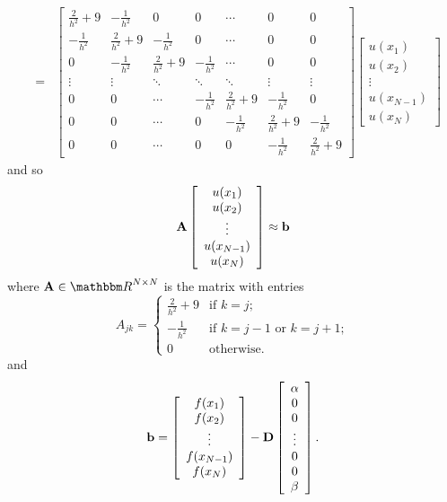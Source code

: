 \begin{solution}
\begin{enumerate}
\begin{eqnarray*}
\\
&=&\left[\begin{array}{ccccccccc} 
\frac{2}{h^2}+9 & -\frac{1}{h^2} & 0 & 0 & \cdots & 0 & 0
\\
-\frac{1}{h^2} & \frac{2}{h^2}+9 & -\frac{1}{h^2} & 0 & \cdots & 0 & 0
\\
 0 & -\frac{1}{h^2} & \frac{2}{h^2}+9 & -\frac{1}{h^2} & \cdots & 0 & 0
\\
\vdots & \vdots & \ddots & \ddots & \ddots & \vdots & \vdots
\\
0 & 0 & \cdots & -\frac{1}{h^2} & \frac{2}{h^2}+9 & -\frac{1}{h^2} & 0
\\
0  & 0 & \cdots & 0 & -\frac{1}{h^2} & \frac{2}{h^2}+9 & -\frac{1}{h^2}
\\
0 & 0 & \cdots & 0 & 0 & -\frac{1}{h^2} & \frac{2}{h^2}+9
 \end{array}\right]
\left[\begin{array}{c} u(x_1) \\u(x_2) \\ \vdots \\ u(x_{N-1}) \\ u(x_N) \end{array}\right]
\end{eqnarray*}
and so
\[
{\bf A}\left[\begin{array}{c} u(x_1) \\u(x_2) \\ \vdots \\ u(x_{N-1}) \\ u(x_N) \end{array}\right]\approx{\bf b}
\]
where $\BA\in\R^{N\times N}$ is the matrix with entries
\[
A_{jk}=\left\{\begin{array}{rl}
\frac{2}{h^2}+9 & \mbox{if }k=j;
\\
-\frac{1}{h^2} & \mbox{if }k=j-1\mbox{ or }k=j+1;
\\
0 & \mbox{otherwise}.
\end{array}\right.
\]
and
\[
{\bf b}=\left[\begin{array}{c} f(x_1) \\ f(x_2) \\ \vdots \\ f(x_{N-1}) \\ f(x_N) \end{array}\right]-{\bf D}\left[\begin{array}{c} \alpha \\ 0 \\ 0 \\ \vdots \\ 0 \\ 0 \\ \beta \end{array}\right].
\]
\end{enumerate}
\end{solution}

